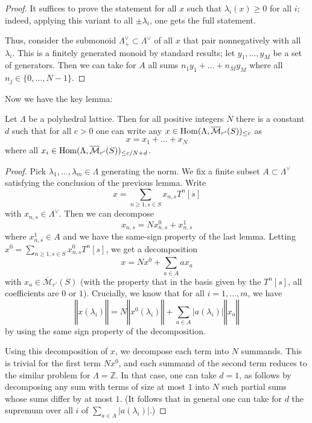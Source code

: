 \begin{proof}
  It suffices to prove the statement for all $x$ such that $\lambda_i(x)\geq 0$ for all $i$;
  indeed, applying this variant to all $\pm \lambda_i$, one gets the full statement.

  Thus, consider the submonoid $\Lambda^\vee_+\subset \Lambda^\vee$
  of all $x$ that pair nonnegatively with all $\lambda_i$.
  This is a finitely generated monoid by standard results;
  let $y_1,\ldots,y_M$ be a set of generators.
  Then we can take for $A$ all sums $n_1y_1+\ldots+n_My_M$ where all $n_j\in \{0,\ldots,N-1\}$.
\end{proof}

Now we have the key lemma:

\begin{lemma}
  \label{combi}
  \leanok
  Let $\Lambda$ be a polyhedral lattice.
  Then for all positive integers $N$ there is a constant $d$
  such that for all $c>0$ one can write any
  $x\in \operatorname{Hom}(\Lambda,\overline{\mathcal M}_{r'}(S))_{\leq c}$ as
  \[
    x=x_1+\ldots+x_N
  \]
  where all $x_i\in \operatorname{Hom}(\Lambda,\overline{\mathcal M}_{r'}(S))_{\leq c/N+d}$.
\end{lemma}

\begin{proof}
  Pick $\lambda_1,\ldots,\lambda_m\in \Lambda$ generating the norm. We fix a finite subset $A\subset \Lambda^\vee$ satisfying the conclusion of the previous lemma. Write
  \[
  x=\sum_{n\geq 1, s\in S} x_{n,s} T^n [s]
  \]
  with $x_{n,s}\in \Lambda^\vee$. Then we can decompose
  \[
  x_{n,s} = N x_{n,s}^0 + x_{n,s}^1
  \]
  where $x_{n,s}^1\in A$ and we have the same-sign property of the last lemma. Letting $x^0 = \sum_{n\geq 1, s\in S} x_{n,s}^0 T^n [s]$, we get a decomposition
  \[
  x = Nx^0 + \sum_{a\in A} a x_a
  \]
  with $x_a\in \overline{\mathcal M}_{r'}(S)$ (with the property that in the
  basis given by the $T^n [s]$, all coefficients are $0$ or $1$). Crucially,
  we know that for all $i=1,\ldots,m$, we have
  \[
  ‖x(\lambda_i)‖ = N ‖x^0(\lambda_i)‖ + \sum_{a\in A} |a(\lambda_i)| ‖x_a‖
  \]
  by using the same sign property of the decomposition.

  Using this decomposition of $x$, we decompose each term into $N$ summands.
  This is trivial for the first term $Nx^0$,
  and each summand of the second term reduces to the similar problem for $\Lambda=\mathbb Z$.
  In that case, one can take $d=1$,
  as follows by decomposing any sum with terms of size at most $1$
  into $N$ such partial sums whose sums differ by at most $1$.
  (It follows that in general one can take for $d$
  the supremum over all $i$ of $\sum_{a\in A} |a(\lambda_i)|$.)
\end{proof}



